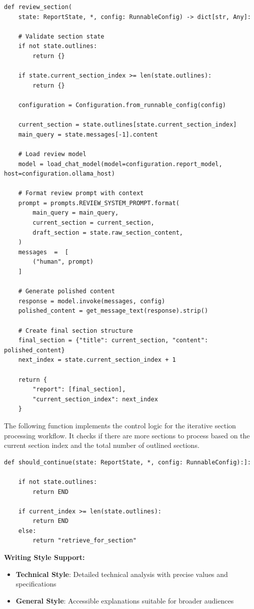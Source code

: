 \documentclass[11pt,a4paper]{report}
\begin{document}
\begin{lstlisting}[caption={Review section node}]
def review_section(
    state: ReportState, *, config: RunnableConfig) -> dict[str, Any]:

    # Validate section state
    if not state.outlines:
        return {}

    if state.current_section_index >= len(state.outlines):
        return {}
        
    configuration = Configuration.from_runnable_config(config)
    
    current_section = state.outlines[state.current_section_index]
    main_query = state.messages[-1].content

    # Load review model
    model = load_chat_model(model=configuration.report_model, host=configuration.ollama_host)
    
    # Format review prompt with context
    prompt = prompts.REVIEW_SYSTEM_PROMPT.format(
        main_query = main_query,
        current_section = current_section,
        draft_section = state.raw_section_content,
    )
    messages  =  [
        ("human", prompt)
    ]

    # Generate polished content
    response = model.invoke(messages, config)
    polished_content = get_message_text(response).strip()
    
    # Create final section structure
    final_section = {"title": current_section, "content": polished_content}
    next_index = state.current_section_index + 1
    
    return {
        "report": [final_section],
        "current_section_index": next_index
    }
\end{lstlisting}

The following function implements the control logic for the iterative section processing workflow. It checks if there are more sections to process based on the current section index and the total number of outlined sections.
    
\begin{lstlisting}[caption={Should continue conditional edge}]
def should_continue(state: ReportState, *, config: RunnableConfig):]:

    if not state.outlines:
        return END
    
    if current_index >= len(state.outlines):
        return END
    else:
        return "retrieve_for_section"
\end{lstlisting}

\textbf{Writing Style Support:}
\begin{itemize}
    \item \textbf{Technical Style}: Detailed technical analysis with precise values and specifications
    \item \textbf{General Style}: Accessible explanations suitable for broader audiences
\end{itemize}
\end{document}
